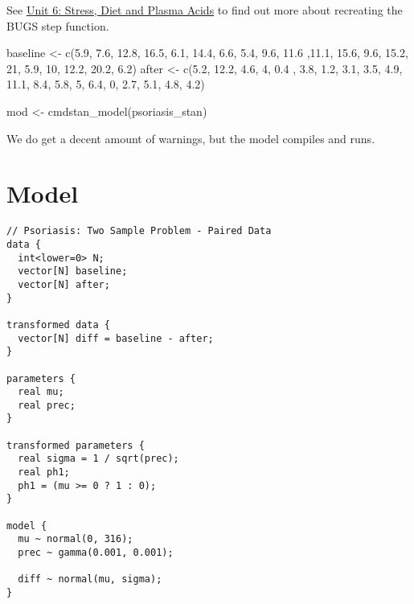 \documentclass[
  letterpaper,
  DIV=11,
  numbers=noendperiod]{scrreprt}
\newenvironment{Shaded}{\begin{snugshade}}{\end{snugshade}}
\newcommand{\DecValTok}[1]{\textcolor[rgb]{0.68,0.00,0.00}{#1}}
\newcommand{\FloatTok}[1]{\textcolor[rgb]{0.68,0.00,0.00}{#1}}
\newcommand{\FunctionTok}[1]{\textcolor[rgb]{0.28,0.35,0.67}{#1}}
\newcommand{\NormalTok}[1]{\textcolor[rgb]{0.00,0.23,0.31}{#1}}
\newcommand{\OtherTok}[1]{\textcolor[rgb]{0.00,0.23,0.31}{#1}}
\begin{document}
See \protect\hyperlink{stress-diet-and-plasma-acids}{Unit 6: Stress,
Diet and Plasma Acids} to find out more about recreating the BUGS step
function.

\begin{Shaded}
\begin{Highlighting}[]
\NormalTok{baseline }\OtherTok{\textless{}{-}} \FunctionTok{c}\NormalTok{(}\FloatTok{5.9}\NormalTok{, }\FloatTok{7.6}\NormalTok{, }\FloatTok{12.8}\NormalTok{, }\FloatTok{16.5}\NormalTok{, }\FloatTok{6.1}\NormalTok{, }\FloatTok{14.4}\NormalTok{, }\FloatTok{6.6}\NormalTok{, }\FloatTok{5.4}\NormalTok{, }\FloatTok{9.6}\NormalTok{, }\FloatTok{11.6}\NormalTok{ ,}\FloatTok{11.1}\NormalTok{, }\FloatTok{15.6}\NormalTok{, }\FloatTok{9.6}\NormalTok{, }\FloatTok{15.2}\NormalTok{, }\DecValTok{21}\NormalTok{, }\FloatTok{5.9}\NormalTok{, }\DecValTok{10}\NormalTok{, }\FloatTok{12.2}\NormalTok{, }\FloatTok{20.2}\NormalTok{, }\FloatTok{6.2}\NormalTok{)}
\NormalTok{after }\OtherTok{\textless{}{-}} \FunctionTok{c}\NormalTok{(}\FloatTok{5.2}\NormalTok{, }\FloatTok{12.2}\NormalTok{, }\FloatTok{4.6}\NormalTok{, }\DecValTok{4}\NormalTok{, }\FloatTok{0.4}\NormalTok{ , }\FloatTok{3.8}\NormalTok{, }\FloatTok{1.2}\NormalTok{, }\FloatTok{3.1}\NormalTok{, }\FloatTok{3.5}\NormalTok{, }\FloatTok{4.9}\NormalTok{, }\FloatTok{11.1}\NormalTok{, }\FloatTok{8.4}\NormalTok{, }\FloatTok{5.8}\NormalTok{, }\DecValTok{5}\NormalTok{, }\FloatTok{6.4}\NormalTok{, }\DecValTok{0}\NormalTok{, }\FloatTok{2.7}\NormalTok{, }\FloatTok{5.1}\NormalTok{, }\FloatTok{4.8}\NormalTok{, }\FloatTok{4.2}\NormalTok{)}
\end{Highlighting}
\end{Shaded}

\begin{Shaded}
\begin{Highlighting}[]
\NormalTok{mod }\OtherTok{\textless{}{-}} \FunctionTok{cmdstan\_model}\NormalTok{(psoriasis\_stan)}
\end{Highlighting}
\end{Shaded}

We do get a decent amount of warnings, but the model compiles and runs.

\hypertarget{model}{%
\section*{Model}\label{model}}


\begin{verbatim}
// Psoriasis: Two Sample Problem - Paired Data
data {
  int<lower=0> N;
  vector[N] baseline;
  vector[N] after;
}

transformed data {
  vector[N] diff = baseline - after;
}

parameters {
  real mu;
  real prec;
}

transformed parameters {
  real sigma = 1 / sqrt(prec);
  real ph1;
  ph1 = (mu >= 0 ? 1 : 0);
}

model {
  mu ~ normal(0, 316);
  prec ~ gamma(0.001, 0.001);

  diff ~ normal(mu, sigma);
}
\end{verbatim}
\end{document}
